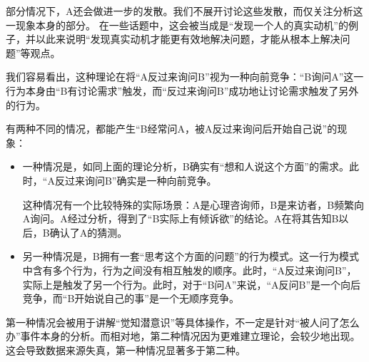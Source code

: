 \begin{explain}
部分情况下，A还会做进一步的发散。我们不展开讨论这些发散，而仅关注分析这一现象本身的部分。
\insertparanotes
在一些话题中，这会被当成是“发现一个人的真实动机”的例子，并以此来说明“发现真实动机才能更有效地解决问题，才能从根本上解决问题”等观点。

我们容易看出，这种理论在将“A反过来询问B”视为一种向前竞争：“B询问A”这一行为本身由“B有讨论需求”触发，而“反过来询问B”成功地让讨论需求触发了另外的行为。
\insertparanotes
\end{explain}
\begin{explain}
有两种不同的情况，都能产生“B经常问A，被A反过来询问后开始自己说”的现象：
\begin{itemize}
\item 一种情况是，如同上面的理论分析，B确实有“想和人说这个方面”的需求。此时，“A反过来询问B”确实是一种向前竞争。

这种情况有一个比较特殊的实际场景：A是心理咨询师，B是来访者，B频繁向A询问。A经过分析，得到了“B实际上有倾诉欲”的结论。A在将其告知B以后，B确认了A的猜测。
\insertparanotes
\item 另一种情况是，B拥有一套“思考这个方面的问题”的行为模式。这一行为模式中含有多个行为，行为之间没有相互触发的顺序。此时，“A反过来询问B”，实际上是触发了另一个行为。此时，对于“B问A”来说，“A反问B”是一个向后竞争，而“B开始说自己的事”是一个无顺序竞争。
\insertparanotes
\end{itemize}
第一种情况会被用于讲解“觉知潜意识”等具体操作，不一定是针对“被人问了怎么办”事件本身的分析。而相对地，第二种情况因为更难建立理论，会较少地出现。这会导致数据来源失真，第一种情况显著多于第二种。
\end{explain}
